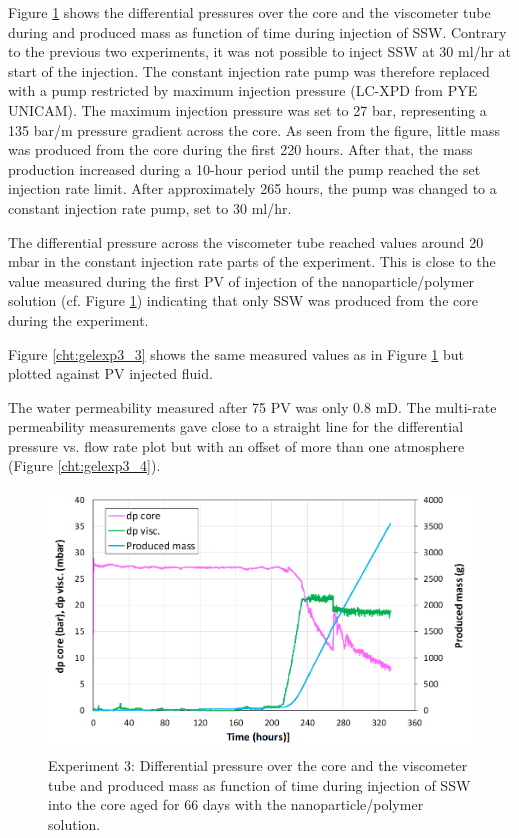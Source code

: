 Figure \ref{cht:gelexp3_2} shows the differential pressures over the core and the viscometer tube during and produced mass as function of time during injection of SSW. Contrary to the previous two experiments, it was not possible to inject SSW at 30 ml/hr at start of the injection. The constant injection rate pump was therefore replaced with a pump restricted by maximum injection pressure (LC-XPD from PYE UNICAM). The maximum injection pressure was set to 27 bar, representing a 135 bar/m pressure gradient across the core. As seen from the figure, little mass was produced from the core during the first 220 hours. After that, the mass production increased during a 10-hour period until the pump reached the set injection rate limit. After approximately 265 hours, the pump was changed to a constant injection rate pump, set to 30 ml/hr.

The differential pressure across the viscometer tube reached values around 20 mbar in the constant injection rate parts of the experiment. This is close to the value measured during the first PV of injection of the nanoparticle/polymer solution (cf. Figure \ref{cht:gelexp3_2}) indicating that only SSW was produced from the core during the experiment.

Figure \ref{cht:gelexp3_3} shows the same measured values as in Figure \ref{cht:gelexp3_2} but plotted against PV injected fluid.

The water permeability measured after 75 PV was only 0.8 mD. The multi-rate permeability measurements gave close to a straight line for the differential pressure vs. flow rate plot but with an offset of more than one atmosphere (Figure \ref{cht:gelexp3_4}).


\begin{figure}[h!]
    \centering
    \includegraphics[width=\textwidth]{img/cht/gelexp3_2.png}
    \caption{Experiment 3: Differential pressure over the core and the viscometer tube and produced mass as function of time during injection of SSW into the core aged for 66 days with the nanoparticle/polymer solution.}
    \label{cht:gelexp3_2} %
\end{figure}

